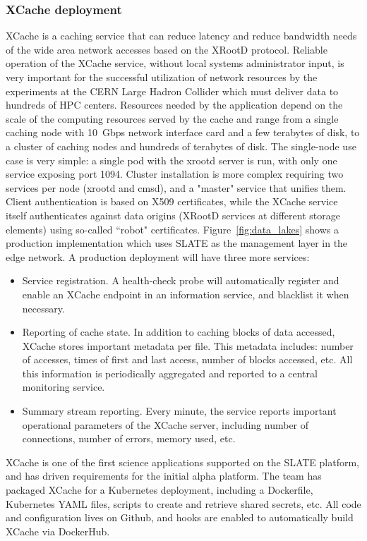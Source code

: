 \documentclass[sigconf]{acmart}
\begin{document}
\subsubsection{XCache deployment}

XCache  is a caching service that can reduce latency and reduce bandwidth needs of the wide area network accesses based on the XRootD \cite{xrootd} protocol. Reliable operation of the XCache service, without local systems administrator input, is very important for the successful utilization of network resources by the experiments at the CERN Large Hadron Collider which must deliver data to hundreds of HPC centers. Resources needed by the application depend on the scale of the computing resources served by the cache and range from a single caching node with 10~Gbps network interface card and a few terabytes  of disk, to a cluster of caching nodes and hundreds of terabytes of disk. The single-node use case is very simple: a single pod with the xrootd server is run, with only one service exposing port 1094. Cluster installation is more complex requiring two services per node (xrootd and cmsd), and a "master" service that unifies them. Client authentication is based on X509\cite{RFC5280} certificates, while the XCache service itself authenticates against data origins (XRootD services at different storage elements) using so-called ``robot" certificates. Figure~\ref{fig:data_lakes} shows a production implementation which uses SLATE as the management layer in the edge network.  A production deployment will have three more services:
\begin{itemize}
    \item Service registration. A health-check probe will automatically register and enable an XCache endpoint in an information service, and blacklist it when necessary.   
    \item Reporting of cache state. In addition to caching blocks of data accessed, XCache stores important metadata per file. This metadata includes: number of accesses, times of first and last access, number of blocks accessed, etc. All this information is periodically aggregated and reported to a central monitoring service. 
    \item Summary stream reporting. Every minute, the service reports important operational parameters of the XCache server, including number of connections, number of errors, memory used, etc. 
\end{itemize} 

XCache is one of the first science applications supported on the SLATE platform, and has driven requirements for the initial alpha platform. The team has packaged XCache for a Kubernetes deployment, including a Dockerfile, Kubernetes YAML files, scripts to create and retrieve shared secrets, etc. All code and configuration lives on Github, and hooks are enabled to automatically build XCache via DockerHub. 
\end{document}
